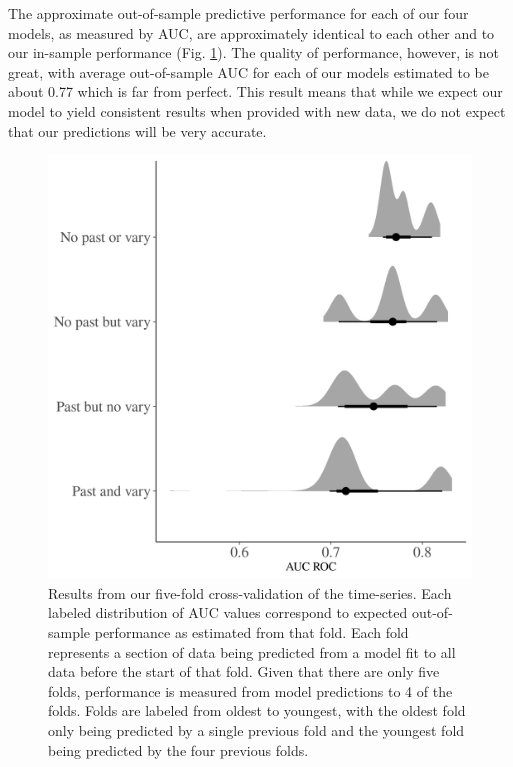 \documentclass[12pt,letterpaper]{article}
\begin{document}
The approximate out-of-sample predictive performance for each of our four models, as measured by AUC, are approximately identical to each other and to our in-sample performance (Fig. \ref{fig:fold_auc}). The quality of performance, however, is not great, with average out-of-sample AUC for each of our models estimated to be about 0.77 which is far from perfect. This result means that while we expect our model to yield consistent results when provided with new data, we do not expect that our predictions will be very accurate.
\begin{figure}[ht]
  \centering
  \includegraphics[width=\textwidth,height=0.5\textheight,keepaspectratio=true]{../results/figure/fold_auc}
  \caption{Results from our five-fold cross-validation of the time-series. Each labeled distribution of AUC values correspond to expected out-of-sample performance as estimated from that fold. Each fold represents a section of data being predicted from a model fit to all data before the start of that fold. Given that there are only five folds, performance is measured from model predictions to 4 of the folds. Folds are labeled from oldest to youngest, with the oldest fold only being predicted by a single previous fold and the youngest fold being predicted by the four previous folds.}
  \label{fig:fold_auc}
\end{figure}
\end{document}
